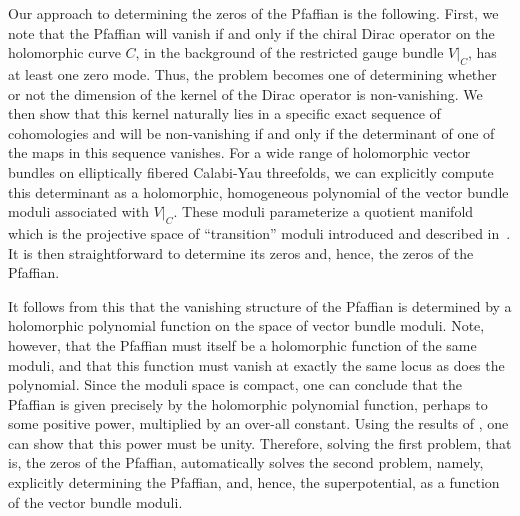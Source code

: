 \documentclass[a4paper,12pt]{article}
\numberwithin{equation}{section}
\theoremstyle{plain}
\begin{document}
Our approach to determining the zeros of the Pfaffian is the following.
First, we note that the Pfaffian will vanish if and only if the chiral
Dirac
operator on the holomorphic curve $C$, in the background of the
restricted gauge bundle $V|_C$, has at least one zero mode. Thus,
the problem becomes one of determining whether or not the dimension of the
kernel of the Dirac operator is non-vanishing. We then show that this
kernel
naturally lies in a specific exact sequence of cohomologies and will be
non-vanishing if and only if the determinant of one of the maps in this
sequence vanishes. For a wide range of holomorphic vector bundles on
elliptically fibered Calabi-Yau threefolds, we can explicitly compute this
determinant as a holomorphic, homogeneous polynomial of the vector bundle
moduli associated with $V|_{C}$.
These moduli
parameterize a quotient manifold which is the projective
space of ``transition'' moduli introduced and described in~\cite{BDOold}.
It is then straightforward to determine its zeros and,
hence, the zeros of the Pfaffian.

It follows from this that the vanishing structure of the Pfaffian is
determined by a holomorphic polynomial function on the space of vector
bundle
moduli.
Note, however, that the Pfaffian must itself be a holomorphic function of
the
same moduli, and that this function must vanish at exactly the same locus
as does
the polynomial. Since the moduli space  is compact, one can conclude that
the
Pfaffian is given precisely by the holomorphic polynomial function,
perhaps to some
positive power, multiplied by an over-all constant. Using the results of
\cite{Bismut1,Bismut2,Bismut3}, one can show that this power must be unity.
Therefore, solving the
first problem, that is, the zeros of the Pfaffian, automatically solves
the second
problem, namely, explicitly determining the Pfaffian, and, hence, the
superpotential, as a function of the vector bundle moduli.
\end{document}
